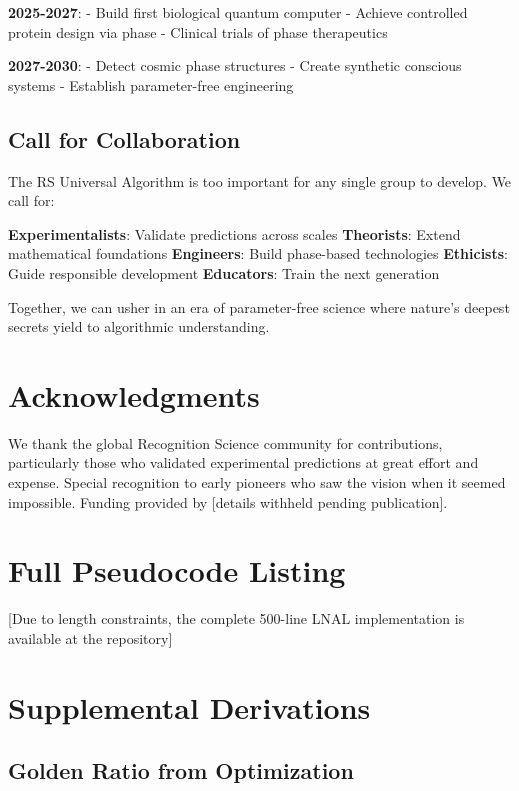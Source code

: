 \documentclass[12pt,a4paper]{article}
\begin{document}
{{\textbf{2025-2027}:
- Build first biological quantum computer
- Achieve controlled protein design via phase
- Clinical trials of phase therapeutics

\textbf{2027-2030}:
- Detect cosmic phase structures
- Create synthetic conscious systems
- Establish parameter-free engineering

\subsection{Call for Collaboration}

The RS Universal Algorithm is too important for any single group to develop. We call for:

\textbf{Experimentalists}: Validate predictions across scales
\textbf{Theorists}: Extend mathematical foundations
\textbf{Engineers}: Build phase-based technologies
\textbf{Ethicists}: Guide responsible development
\textbf{Educators}: Train the next generation

Together, we can usher in an era of parameter-free science where nature's deepest secrets yield to algorithmic understanding.

\section*{Acknowledgments}

We thank the global Recognition Science community for contributions, particularly those who validated experimental predictions at great effort and expense. Special recognition to early pioneers who saw the vision when it seemed impossible. Funding provided by [details withheld pending publication].




\appendix

\section{Full Pseudocode Listing}

[Due to length constraints, the complete 500-line LNAL implementation is available at the repository]

\section{Supplemental Derivations}

\subsection{Golden Ratio from Optimization}

}}
\end{document}
